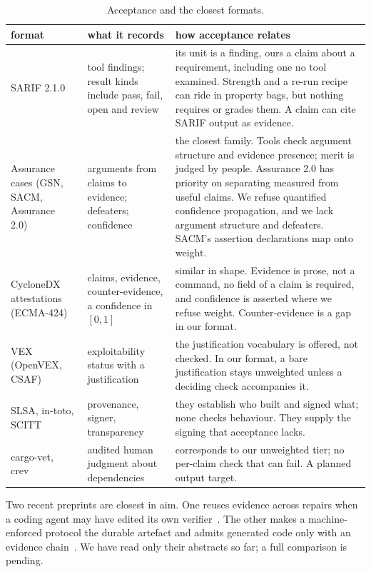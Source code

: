 \documentclass[11pt]{article}
\theoremstyle{definition}
\theoremstyle{remark}
\begin{document}
\begin{table}[t]
\centering\small
\begin{tabularx}{\linewidth}{@{}>{\raggedright\arraybackslash}p{2.6cm}>{\raggedright\arraybackslash}X>{\raggedright\arraybackslash}X@{}}
\toprule
format & what it records & how acceptance relates \\
\midrule
SARIF 2.1.0~\cite{sarif} & tool findings; result kinds include pass, fail, open and review & its unit is a finding, ours a claim about a requirement, including one no tool examined. Strength and a re-run recipe can ride in property bags, but nothing requires or grades them. A claim can cite SARIF output as evidence. \\
Assurance cases (GSN, SACM, Assurance 2.0)~\cite{gsn3,sacm23,bloomfield2022} & arguments from claims to evidence; defeaters; confidence & the closest family. Tools check argument structure and evidence presence; merit is judged by people. Assurance 2.0 has priority on separating measured from useful claims. We refuse quantified confidence propagation, and we lack argument structure and defeaters. SACM's assertion declarations map onto weight. \\
CycloneDX attestations (ECMA-424)~\cite{cyclonedx16} & claims, evidence, counter-evidence, a confidence in $[0,1]$ & similar in shape. Evidence is prose, not a command, no field of a claim is required, and confidence is asserted where we refuse weight. Counter-evidence is a gap in our format. \\
VEX (OpenVEX, CSAF)~\cite{openvex,csaf} & exploitability status with a justification & the justification vocabulary is offered, not checked. In our format, a bare justification stays unweighted unless a deciding check accompanies it. \\
SLSA, in-toto, SCITT~\cite{slsa,intoto,rfc9943} & provenance, signer, transparency & they establish who built and signed what; none checks behaviour. They supply the signing that acceptance lacks. \\
cargo-vet, crev~\cite{cargovet,crev} & audited human judgment about dependencies & corresponds to our unweighted tier; no per-claim check that can fail. A planned output target. \\
\bottomrule
\end{tabularx}
\caption{Acceptance and the closest formats.}\label{tab:rel}
\end{table}

Two recent preprints are closest in aim. One reuses evidence across repairs when a coding agent may
have edited its own verifier~\cite{petel2026}. The other makes a machine-enforced protocol the
durable artefact and admits generated code only with an evidence chain~\cite{he2026}. We have read
only their abstracts so far; a full comparison is pending.
\end{document}
